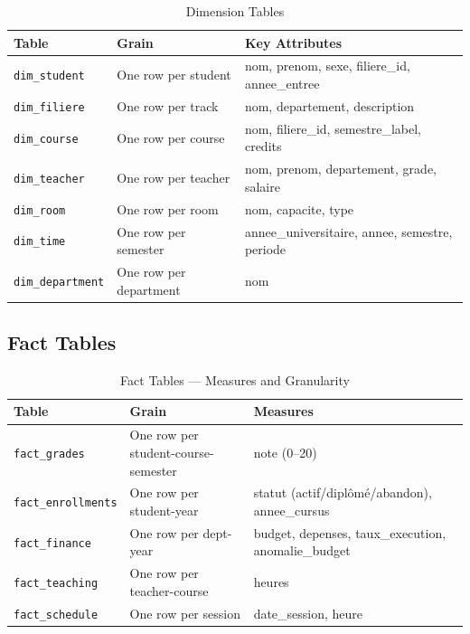 \documentclass[12pt, a4paper]{report}
\begin{document}
\begin{table}[H]
\centering
\caption{Dimension Tables}
\label{tab:dim_tables}
\begin{tabular}{@{}lll@{}}
\toprule
\textbf{Table} & \textbf{Grain} & \textbf{Key Attributes} \\
\midrule
\texttt{dim\_student}    & One row per student     & nom, prenom, sexe, filiere\_id, annee\_entree \\
\texttt{dim\_filiere}    & One row per track       & nom, departement, description \\
\texttt{dim\_course}     & One row per course      & nom, filiere\_id, semestre\_label, credits \\
\texttt{dim\_teacher}    & One row per teacher     & nom, prenom, departement, grade, salaire \\
\texttt{dim\_room}       & One row per room        & nom, capacite, type \\
\texttt{dim\_time}       & One row per semester    & annee\_universitaire, annee, semestre, periode \\
\texttt{dim\_department} & One row per department  & nom \\
\bottomrule
\end{tabular}
\end{table}

\subsection{Fact Tables}

\begin{table}[H]
\centering
\caption{Fact Tables — Measures and Granularity}
\label{tab:fact_tables}
\begin{tabular}{@{}lp{4cm}p{5.5cm}@{}}
\toprule
\textbf{Table} & \textbf{Grain} & \textbf{Measures} \\
\midrule
\texttt{fact\_grades}      & One row per student-course-semester  & note (0--20) \\
\texttt{fact\_enrollments} & One row per student-year             & statut (actif/diplômé/abandon), annee\_cursus \\
\texttt{fact\_finance}     & One row per dept-year                & budget, depenses, taux\_execution, anomalie\_budget \\
\texttt{fact\_teaching}    & One row per teacher-course           & heures \\
\texttt{fact\_schedule}    & One row per session                  & date\_session, heure \\
\bottomrule
\end{tabular}
\end{table}
\end{document}
